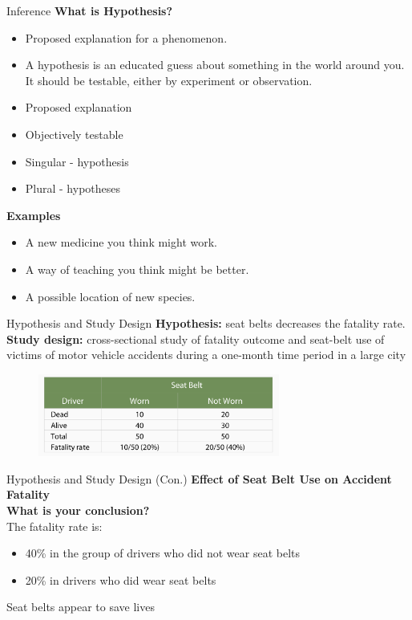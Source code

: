 \begin{frame}[t]{Inference}
	\textbf{What is Hypothesis?} \\
	\begin{itemize}
		\item Proposed explanation for a phenomenon.
		\item A hypothesis is an educated guess about something in the world around you. It should be testable, either by experiment or observation.
		\item Proposed explanation
		\item Objectively testable
		\item Singular - hypothesis
		\item Plural - hypotheses
	\end{itemize}
	\textbf{Examples}
		\begin{itemize}
		\item A new medicine you think might work.
		\item A way of teaching you think might be better.
		\item A possible location of new species.
	\end{itemize}
\end{frame}

\begin{frame}[t]{Hypothesis and Study Design}
	\textbf{Hypothesis:} seat belts decreases the fatality rate. \\
	\textbf{Study design:}  cross-sectional study of fatality outcome and seat-belt use of victims of motor vehicle accidents during a one-month time period in a large city
	\begin{figure}
		\includegraphics[width=300px]{img/seat_belt}
	\end{figure}
\end{frame}

\begin{frame}[t]{Hypothesis and Study Design (Con.)}
	\textbf{\large{Effect of Seat Belt Use on Accident Fatality}} \\
	\textbf{What is your conclusion?}  \\
	The fatality rate is: \\
	\begin{itemize}
		\item 40\% in the group of drivers who did not wear seat belts
		\item 20\% in drivers who did wear seat belts
	\end{itemize}
	Seat belts appear to save lives
\end{frame}

